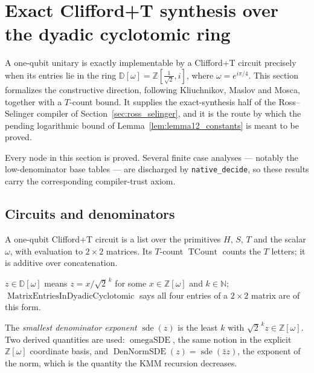 \section{Exact Clifford+T synthesis over the dyadic cyclotomic ring}
\label{sec:kmm}

A one-qubit unitary is exactly implementable by a Clifford+T circuit precisely
when its entries lie in the ring
$\mathbb{D}[\omega] = \mathbb{Z}[\tfrac1{\sqrt2}, i]$, where
$\omega = e^{i\pi/4}$.  This section formalizes the constructive direction,
following Kliuchnikov, Maslov and Mosca, together with a $T$-count bound.  It
supplies the exact-synthesis half of the Ross--Selinger compiler of
Section~\ref{sec:ross_selinger}, and it is the route by which the pending
logarithmic bound of Lemma~\ref{lem:lemma12_constants} is meant to be proved.

Every node in this section is proved.  Several finite case analyses --- notably
the low-denominator base tables --- are discharged by \texttt{native\_decide},
so these results carry the corresponding compiler-trust axiom.

\subsection{Circuits and denominators}

\begin{definition}
  \label{def:ct_circuit}
  \leanok
  A one-qubit Clifford+T circuit is a list over the primitives $H$, $S$, $T$
  and the scalar $\omega$, with evaluation to $2\times2$ matrices.  Its
  $T$-count $\operatorname{TCount}$ counts the $T$ letters; it is additive over
  concatenation.
\end{definition}

\begin{definition}
  \label{def:dyadic}
  \leanok
  $z \in \mathbb{D}[\omega]$ means $z = x/\sqrt2^{\,k}$ for some
  $x \in \mathbb{Z}[\omega]$ and $k \in \mathbb{N}$;
  $\operatorname{MatrixEntriesInDyadicCyclotomic}$ says all four entries of a
  $2\times2$ matrix are of this form.
\end{definition}

\begin{definition}
  \label{def:sde}
  \leanok
  The \emph{smallest denominator exponent} $\operatorname{sde}(z)$ is the least
  $k$ with $\sqrt2^{\,k} z \in \mathbb{Z}[\omega]$.  Two derived quantities are
  used: $\operatorname{omegaSDE}$, the same notion in the explicit
  $\mathbb{Z}[\omega]$ coordinate basis, and
  $\operatorname{DenNormSDE}(z) = \operatorname{sde}(\bar z z)$, the exponent of
  the norm, which is the quantity the KMM recursion decreases.
\end{definition}

